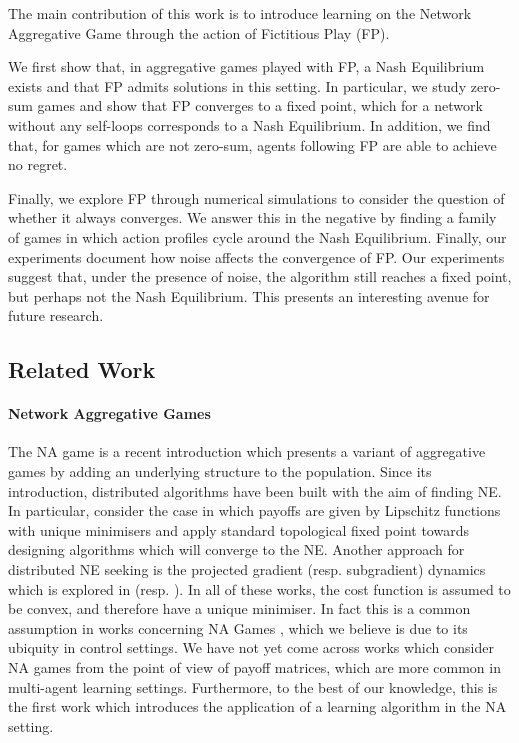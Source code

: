 \documentclass{article}
\theoremstyle{definition}
\begin{document}
  The main contribution of this work is to introduce learning on the Network Aggregative Game
  through the action of Fictitious Play (FP).

  We first show that, in aggregative games played with FP, a Nash Equilibrium exists and that FP admits
  solutions in this setting. In particular, we study zero-sum games and show that
  FP converges to a fixed point, which for a network without any
  self-loops corresponds to a Nash Equilibrium. In addition, we find that, for games
  which are not zero-sum, agents following FP are able to
  achieve no regret.

  Finally, we explore FP through numerical simulations to consider the
  question of whether it always converges. We answer this in the negative by finding a family of
  games in which action profiles cycle around the Nash Equilibrium. Finally, our experiments
  document how noise affects the convergence of FP. Our experiments suggest that, under
  the presence of noise, the algorithm still reaches a fixed point, but perhaps not the Nash
  Equilibrium. This presents an interesting avenue for future research.

\subsection{Related Work}

\paragraph{Network Aggregative Games}

The NA game is a recent introduction \cite{Parise2015} which presents
a variant of aggregative games by adding an underlying structure to
the population. Since its introduction, distributed algorithms have
been built with the aim of finding NE. In particular,
\cite{Parise2015, Parise2020} consider the case in which payoffs are
given by Lipschitz functions with unique minimisers and apply standard
topological fixed point towards designing algorithms which will
converge to the NE. Another approach for distributed NE seeking is the
projected gradient (resp. subgradient) dynamics which is explored in
\cite{Zhu2021} (resp. \cite{Shokri2020, Shokri2021}). In all of these
works, the cost function is assumed to be convex, and therefore have a
unique minimiser. In fact this is a common assumption in works
concerning NA Games \cite{Zhu2021, Lei2020}, which we believe is due
to its ubiquity in control settings. We have not yet come across works
which consider NA games from the point of view of payoff matrices,
which are more common in multi-agent learning settings.  Furthermore,
to the best of our knowledge, this is the first work which introduces
the application of a learning algorithm in the NA setting.
\end{document}
